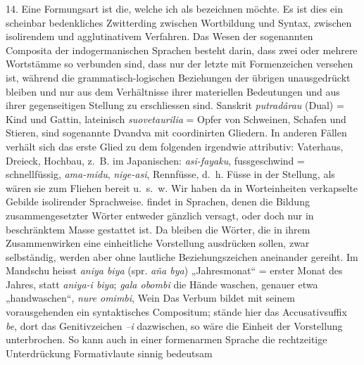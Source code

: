 \label{IV.III.II.4.14}14. Eine  Formungsart ist die, welche ich als  bezeichnen möchte. Es ist dies ein scheinbar bedenkliches Zwitterding zwischen Wortbildung und Syntax, zwischen isolirendem und agglutinativem Verfahren. Das Wesen der sogenannten  Composita der indogermanischen Sprachen besteht darin, dass zwei oder mehrere Wortstämme so  verbunden sind, dass nur der letzte mit Formenzeichen versehen ist, während die grammatisch-logischen Beziehungen der übrigen unausgedrückt bleiben und nur aus dem Verhältnisse ihrer materiellen Bedeutungen und aus ihrer gegenseitigen Stellung zu erschliessen  sind. Sanskrit \textit{putradârau} (Dual) = Kind und Gattin, lateinisch \textit{suovetaurilia} = Opfer von Schweinen, Schafen und Stieren, sind sogenannte Dvandva mit coordinirten Gliedern. In anderen Fällen verhält sich das erste Glied zu dem folgenden irgendwie attributiv: Vaterhaus, Dreieck, Hochbau,  z.~B. im Japanischen: \textit{asi-fayaku}, fussgeschwind = schnellfüssig, \textit{ama-midu},  \textit{nige-asi}, Rennfüsse, d.~h. Füsse in der Stellung, als wären sie zum Fliehen bereit u.~s.~w. Wir haben da in Worteinheiten verkapselte Gebilde isolirender Sprachweise.  findet  in Sprachen, denen die Bildung zusammengesetzter Wörter entweder gänzlich versagt, oder doch nur in beschränktem Masse gestattet ist. Da bleiben die Wörter, die in ihrem Zusammenwirken eine einheitliche Vorstellung ausdrücken sollen, zwar selbständig, werden aber ohne lautliche Beziehungszeichen aneinander gereiht. Im Mandschu heisst \textit{aniya biya} (spr. \textit{aña bya}) „Jahresmonat“ = erster Monat des Jahres, statt \textit{aniya-i biya}; \textit{gala obombi} die Hände waschen, genauer etwa „handwaschen“, \textit{nure omimbi}, Wein  Das Verbum bildet mit seinem vorausgehenden  ein syntaktisches Compositum; stände hier das Accusativsuffix \textit{be}, dort das Genitivzeichen \textit{–i} dazwischen, so wäre die Einheit der Vorstellung unterbrochen.  So kann auch in einer formenarmen Sprache die rechtzeitige Unterdrückung  Formativlaute sinnig bedeutsam 

